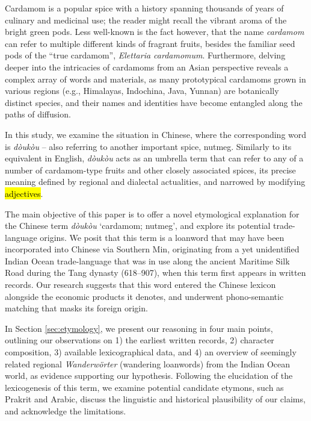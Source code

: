 \documentclass[12pt]{article}
\newcommand{\tc}[1]{\traditionalchinesefont{#1}\rmfamily}
\begin{document}
Cardamom is a popular spice with a history spanning thousands of years of culinary and medicinal use; the reader might recall the vibrant aroma of the bright green pods. Less well-known is the fact however, that the name \textit{cardamom} can refer to multiple different kinds of fragrant fruits, besides the familiar seed pods of the ``true cardamom'', \textit{Elettaria cardamomum}. Furthermore, delving deeper into the intricacies of cardamoms from an Asian perspective reveals a complex array of words and materials, as many prototypical cardamoms grown in various regions (e.g., Himalayas, Indochina, Java, Yunnan) are botanically distinct species, and their names and identities have become entangled along the paths of diffusion.

In this study, we examine the situation in Chinese, where the corresponding word is \tc{豆蔻} \textit{dòukòu} -- also referring to another important spice, nutmeg. Similarly to its equivalent in English, \textit{dòukòu} acts as an umbrella term that can refer to any of a number of cardamom-type fruits and other closely associated spices, its precise meaning defined by regional and dialectal actualities, and narrowed by modifying \hl{adjectives}.

The main objective of this paper is to offer a novel etymological explanation for the Chinese term \textit{dòukòu} `cardamom; nutmeg', and explore its potential trade-language origins. We posit that this term is a loanword that may have been incorporated into Chinese via Southern Min, originating from a yet unidentified Indian Ocean trade-language that was in use along the ancient Maritime Silk Road during the Tang dynasty (618--907), when this term first appears in written records. Our research suggests that this word entered the Chinese lexicon alongside the economic products it denotes, and underwent phono-semantic matching that masks its foreign origin. 

In Section \ref{sec:etymology}, we present our reasoning in four main points, outlining our observations on 1) the earliest written records, 2) character composition, 3) available lexicographical data, and 4) an overview of seemingly related regional \textit{Wanderwörter} (wandering loanwords) from the Indian Ocean world, as evidence supporting our hypothesis. Following the elucidation of the lexicogenesis of this term, we examine potential candidate etymons, such as Prakrit and Arabic, discuss the linguistic and historical plausibility of our claims, and acknowledge the limitations.
\end{document}
